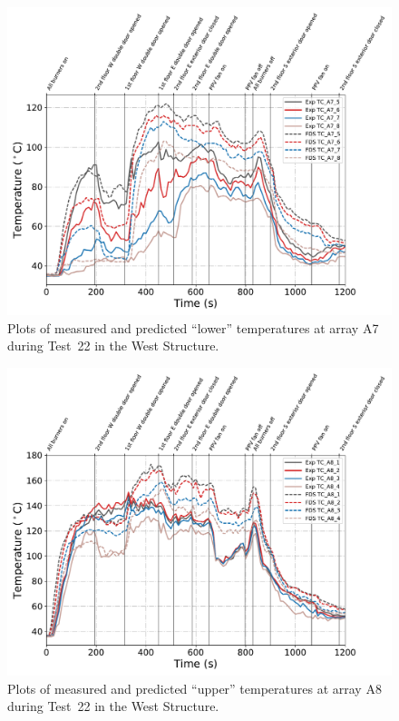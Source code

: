 \begin{figure}[!h]
	\centering
	\includegraphics[width=\columnwidth]{Figures/Plots/Validation/Temperature/Test_22_TC_A7_lower}
	\caption{Plots of measured and predicted ``lower'' temperatures at array A7 during Test~22 in the West Structure.}
	\label{fig:TCA7_lower_data_Test22}
\end{figure}

\begin{figure}[!h]
	\centering
	\includegraphics[width=\columnwidth]{Figures/Plots/Validation/Temperature/Test_22_TC_A8_upper}
	\caption{Plots of measured and predicted ``upper'' temperatures at array A8 during Test~22 in the West Structure.}
	\label{fig:TCA8_upper_data_Test22}
\end{figure}


